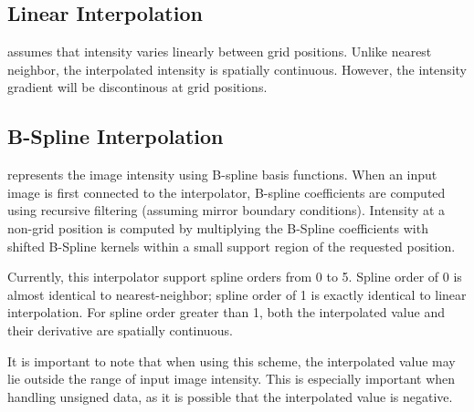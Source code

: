 \subsection{Linear Interpolation}
\label{sec:LinearInterpolation}
 assumes that intensity varies linearly
between grid positions. Unlike nearest neighbor, the interpolated
intensity is spatially continuous. However, the intensity gradient
will be discontinous at grid positions.

\subsection{B-Spline Interpolation}
\label{sec:BSplineInterpolation}
 represents the image intensity 
using B-spline basis functions. When an input image is first 
connected to the interpolator, B-spline 
coefficients are computed using recursive filtering (assuming mirror
boundary conditions). Intensity at a non-grid position is computed
by multiplying the B-Spline coefficients with shifted B-Spline kernels
within a small support region of the requested position.

Currently, this interpolator support spline orders
from 0 to 5. Spline order of 0 is almost identical to nearest-neighbor;
spline order of 1 is exactly identical to linear interpolation. For 
spline order greater than 1, both the interpolated value and their
derivative are spatially continuous.

It is important to note that when using this scheme, the interpolated
value may lie outside the range of input image intensity. This is
especially important when handling unsigned data, as it is possible
that the interpolated value is negative.


